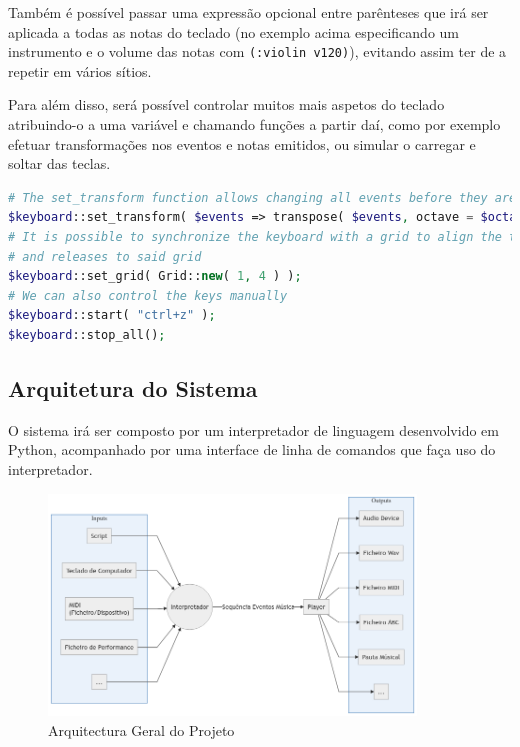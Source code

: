 \documentclass[
  oneside,
  11pt, a4paper,
  footinclude=true,
  headinclude=true,
  cleardoublepage=empty
]{scrbook}
\begin{document}
    Também é possível passar uma expressão opcional entre parênteses que irá ser aplicada a todas as notas do teclado (no exemplo acima especificando um instrumento e o volume das notas com \texttt{(:violin v120)}), evitando assim ter de a repetir em vários sítios.

    Para além disso, será possível controlar muitos mais aspetos do teclado atribuindo-o a uma variável e chamando funções a partir daí, como por exemplo efetuar transformações nos eventos e notas emitidos, ou simular o carregar e soltar das teclas.

\begin{lstlisting}[caption=Exemplo da sintaxe proposta da linguagem,language=PHP]
# The set_transform function allows changing all events before they are emitted by this keyboard
$keyboard::set_transform( $events => transpose( $events, octave = $octave ) );
# It is possible to synchronize the keyboard with a grid to align the timings of key presses 
# and releases to said grid
$keyboard::set_grid( Grid::new( 1, 4 ) );
# We can also control the keys manually
$keyboard::start( "ctrl+z" );
$keyboard::stop_all();

\end{lstlisting}
    
    \subsection{Arquitetura do Sistema}
    O sistema irá ser composto por um interpretador de linguagem desenvolvido em Python, acompanhado por uma interface de linha de comandos que faça uso do interpretador.
	\begin{figure}[h]
	\begin{center}
		\includegraphics[width=0.87\textwidth]{img/diagram_architecture.png}
	\end{center}
	\caption{Arquitectura Geral do Projeto}
	\end{figure}
	
\end{document}
